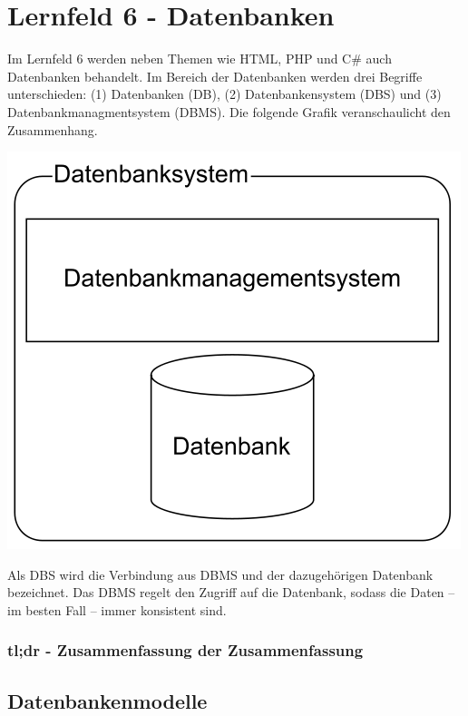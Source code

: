 \section{Lernfeld 6 - Datenbanken}

Im Lernfeld 6 werden neben Themen wie HTML, PHP und C# auch Datenbanken behandelt. Im Bereich der Datenbanken werden drei Begriffe unterschieden: (1) Datenbanken (DB), (2) Datenbankensystem (DBS) und (3) Datenbankmanagmentsystem (DBMS). Die folgende Grafik veranschaulicht den Zusammenhang.

\includegraphics[scale=0.4]{pictures/lf06db-pic/lf06db-begriffszusammenhang.png}

Als DBS wird die Verbindung aus DBMS und der dazugehörigen Datenbank bezeichnet. Das DBMS regelt den Zugriff auf die Datenbank, sodass die Daten -- im besten Fall -- immer konsistent sind. 

\subsubsection{tl;dr - Zusammenfassung der Zusammenfassung}


\subsection{Datenbankenmodelle}

